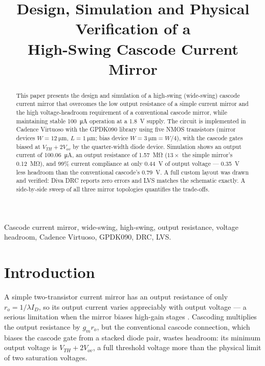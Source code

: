 \documentclass[conference]{IEEEtran}
\begin{document}
\title{Design, Simulation and Physical Verification of a\\ High-Swing Cascode Current Mirror}

\author{
}

\maketitle

\begin{abstract}
This paper presents the design and simulation of a high-swing (wide-swing)
cascode current mirror that overcomes the low output resistance of a simple
current mirror and the high voltage-headroom requirement of a conventional
cascode mirror, while maintaining stable \SI{100}{\micro\ampere} operation at
a \SI{1.8}{\volt} supply. The circuit is implemented in Cadence Virtuoso with
the GPDK090 library using five NMOS transistors (mirror devices
$W=\SI{12}{\micro\metre}$, $L=\SI{1}{\micro\metre}$; bias device
$W=\SI{3}{\micro\metre}=W/4$), with the cascode gates biased at
$V_{TH}+2V_{ov}$ by the quarter-width diode device. Simulation shows an
output current of \SI{100.06}{\micro\ampere}, an output resistance of
\SI{1.57}{\mega\ohm} ($13\times$ the simple mirror's \SI{0.12}{\mega\ohm}),
and 99\% current compliance at only \SI{0.44}{\volt} of output voltage ---
\SI{0.35}{\volt} less headroom than the conventional cascode's
\SI{0.79}{\volt}. A full custom layout was drawn and verified: Diva DRC
reports zero errors and LVS matches the schematic exactly. A side-by-side
sweep of all three mirror topologies quantifies the trade-offs.
\end{abstract}

\begin{IEEEkeywords}
Cascode current mirror, wide-swing, high-swing, output resistance, voltage
headroom, Cadence Virtuoso, GPDK090, DRC, LVS.
\end{IEEEkeywords}

\section{Introduction}
A simple two-transistor current mirror has an output resistance of only
$r_o = 1/\lambda I_D$, so its output current varies appreciably with output
voltage --- a serious limitation when the mirror biases high-gain stages
\cite{gray,razavi}. Cascoding multiplies the output resistance by
$g_m r_o$, but the conventional cascode connection, which biases the cascode
gate from a stacked diode pair, wastes headroom: its minimum output voltage
is $V_{TH}+2V_{ov}$, a full threshold voltage more than the physical limit of
two saturation voltages.
\end{document}
